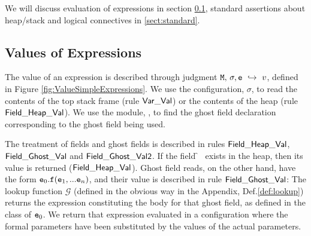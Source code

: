  
We will discuss evaluation of expressions in section \ref{sect:expressions}, standard assertions about heap/stack and logical
 connectives in \ref{sect:standard}. 
 

\subsection{Values of Expressions}
\label{sect:expressions}

The value  of  an expression  is described through judgment $ {\mbox{\tt{\ensuremath{{\mbox{\tt{M}}}}}}},\, \sigma, {\mbox{\tt{e}}} \ \hookrightarrow\  v$,
defined in  Figure \ref{fig:ValueSimpleExpressions}.
We use the configuration, $\sigma$, to read the contents of the top stack frame
(rule ${\sf {Var\_Val}}$) or the contents of the heap (rule
${\sf {Field\_Heap\_Val}}$). We use the module, \M, to find the  ghost field declaration corresponding to the
ghost field being used. 



The treatment of fields and ghost fields is described in rules ${\sf {Field\_Heap\_Val}}$,\\  ${\sf {Field\_Ghost\_Val}}$ and 
${\sf {Field\_Ghost\_Val2}}$.  If the field \f~ exists in the heap, then its value is returned (${\sf {Field\_Heap\_Val}}$). 
Ghost field reads, on the other hand, have the form ${\mbox{\tt{e}}}_0.{\mbox{\tt{f}}}({\mbox{\tt{e}}}_1,...{\mbox{\tt{e}}}_n)$, and their value is
described in rule ${\sf {Field\_Ghost\_Val}}$:
%
The lookup function $\mathcal G$  (defined in the obvious way in the Appendix, Def.\ref{def:lookup})
returns the expression constituting the body for that ghost field, as defined in the class of ${\mbox{\tt{e}}}_0$.
We return  that expression
evaluated in a configuration where the formal parameters have been substituted by the values of the actual
parameters.



